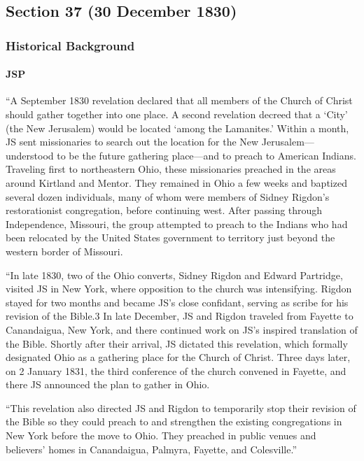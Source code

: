 \subsection{Section 37 (30 December 1830)}
	\label{DC37}
	
	\subsubsection{Historical Background}
		\label{DC37-HB}
		
		\paragraph{JSP}
		
			``A September 1830 revelation declared that all members of the Church of Christ should gather together into one place. A second revelation decreed that a `City' (the New Jerusalem) would be located `among the Lamanites.' Within a month, JS sent missionaries to search out the location for the New Jerusalem---understood to be the future gathering place---and to preach to American Indians. Traveling first to northeastern Ohio, these missionaries preached in the areas around Kirtland and Mentor. They remained in Ohio a few weeks and baptized several dozen individuals, many of whom were members of Sidney Rigdon's restorationist congregation, before continuing west. After passing through Independence, Missouri, the group attempted to preach to the Indians who had been relocated by the United States government to territory just beyond the western border of Missouri.
			
			``In late 1830, two of the Ohio converts, Sidney Rigdon and Edward Partridge, visited JS in New York, where opposition to the church was intensifying. Rigdon stayed for two months and became JS's close confidant, serving as scribe for his revision of the Bible.3 In late December, JS and Rigdon traveled from Fayette to Canandaigua, New York, and there continued work on JS's inspired translation of the Bible. Shortly after their arrival, JS dictated this revelation, which formally designated Ohio as a gathering place for the Church of Christ. Three days later, on 2 January 1831, the third conference of the church convened in Fayette, and there JS announced the plan to gather in Ohio.
			
			``This revelation also directed JS and Rigdon to temporarily stop their revision of the Bible so they could preach to and strengthen the existing congregations in New York before the move to Ohio. They preached in public venues and believers' homes in Canandaigua, Palmyra, Fayette, and Colesville.''
			
